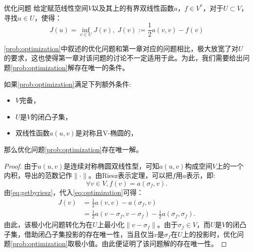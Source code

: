 \documentclass[lang=cn,10pt,newtx]{elegantbook}
\newcommand{\norm}[1]{\|#1\|}
\begin{document}
\begin{definition}{优化问题}
  \label{prob:optimization}
  给定赋范线性空间$V$以及其上的有界双线性函数$a$，$f\in V^{*}$，对于$U\subset V$，寻找$u\in U$，使得：
  \begin{equation}
    \label{eq:optimization}
    J(u)=\inf_{v\in U}J(v),\; J(v):=\frac{1}{2}a(v,v)-f(v)
  \end{equation}
\end{definition}
\ref{prob:optimization}中叙述的优化问题和第一章对应的问题相比，极大放宽了对$U$的要求，这也使得第一章对该问题的讨论不一定适用于此。为此，我们需要给出问题\ref{prob:optimization}解存在唯一的条件。
\begin{theorem}
  如果\ref{prob:optimization}满足下列额外条件:
  \begin{itemize}
    \item $V$完备，
    \item $U$是$V$的闭凸子集，
    \item 双线性函数$a(u,v)$是对称且V-椭圆的，
  \end{itemize}
  那么优化问题\ref{prob:optimization}存在唯一解。
\end{theorem}
\begin{proof}
  由于$a(u,v)$是连续对称椭圆双线性型，可知$a(u,v)$构成空间$V$上的一个内积，导出的范数记作$\norm{\cdot}$。由Riesz表示定理，可以把$f$用$a$表示，即:
  \begin{equation}
    \label{eq:getbyriesz}
    \forall v\in V, f(v)=a(\sigma_{f},v).
  \end{equation}
  由\eqref{eq:getbyriesz}，代入\eqref{eq:optimization}可得：
  \begin{equation}
    \label{eq:simplifyJ}
    \begin{aligned}
      J(v)&=\frac{1}{2}a(v,v)-a(\sigma_{f},v)\\
      &=\frac{1}{2}a(v-\sigma_{f},v-\sigma_{f})-\frac{1}{2}a(\sigma_{f},\sigma_{f}).
    \end{aligned}
  \end{equation}
  由此，该极小化问题转化为在$U$上最小化$\norm{v-\sigma_{f}}$。由于$\sigma_{f}\in V$，而$U$是$V$的闭凸子集，借助闭凸子集投影的存在唯一性，当且仅当$v$是$\sigma_{f}$在$U$上的投影时，优化问题\ref{prob:optimization}取极小值。由此便证明了该问题解的存在唯一性。
\end{proof}
\end{document}
